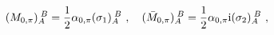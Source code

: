 \begin{equation}
	 (M_{0,\pi})_A^{\;B}=\frac{1}{2}\alpha_{0,\pi}(\sigma_1)_A^{\;B}\ ,\quad (\bar{M}_{0,\pi})_A^{\;B}=\frac{1}{2}\alpha_{0,\pi}{\rm i}(\sigma_2)_A^{\;B}\ ,
       \end{equation}

